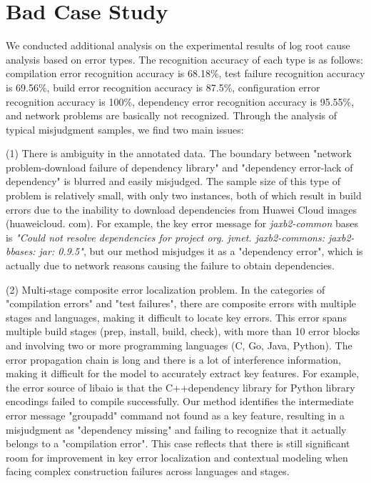 \documentclass[10pt,conference]{IEEEtran}
\begin{document}
\section{Bad Case Study}

We conducted additional analysis on the experimental results of log root cause analysis based on error types. The recognition accuracy of each type is as follows: compilation error recognition accuracy is 68.18\%, test failure recognition accuracy is 69.56\%, build error recognition accuracy is 87.5\%, configuration error recognition accuracy is 100\%, dependency error recognition accuracy is 95.55\%, and network problems are basically not recognized.
Through the analysis of typical misjudgment samples, we find two main issues:

(1) There is ambiguity in the annotated data. The boundary between "network problem-download failure of dependency library" and "dependency error-lack of dependency" is blurred and easily misjudged. The sample size of this type of problem is relatively small, with only two instances, both of which result in build errors due to the inability to download dependencies from Huawei Cloud images (huaweicloud. com).
For example, the key error message for \textit{jaxb2-common} bases is  \textit{"Could not resolve dependencies for project org. jvnet. jaxb2-commons: jaxb2-bbases: jar: 0.9.5"}, but our method misjudges it as a "dependency error", which is actually due to network reasons causing the failure to obtain dependencies.

(2) Multi-stage composite error localization problem. In the categories of "compilation errors" and "test failures", there are composite errors with multiple stages and languages, making it difficult to locate key errors. This error spans multiple build stages (prep, install, build, check), with more than 10 error blocks and involving two or more programming languages (C, Go, Java, Python). The error propagation chain is long and there is a lot of interference information, making it difficult for the model to accurately extract key features.
For example, the error source of libaio is that the C++dependency library for Python library encodings failed to compile successfully. Our method identifies the intermediate error message "groupadd" command not found as a key feature, resulting in a misjudgment as "dependency missing" and failing to recognize that it actually belongs to a "compilation error".
This case reflects that there is still significant room for improvement in key error localization and contextual modeling when facing complex construction failures across languages and stages.
\end{document}
